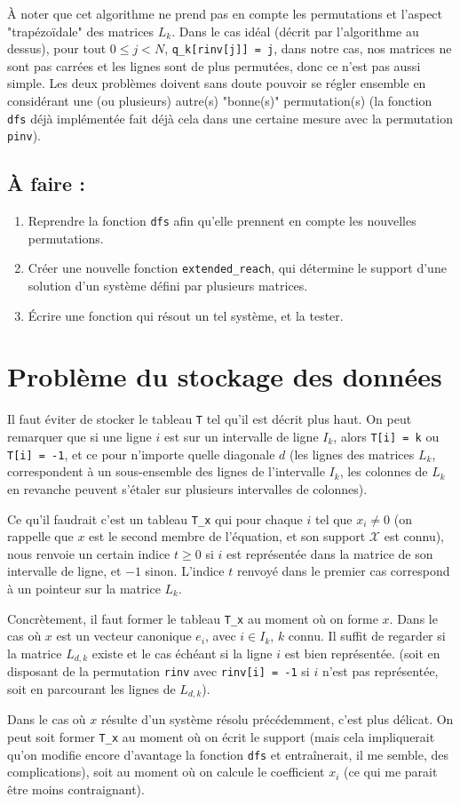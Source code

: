\documentclass{article}
\begin{document}
À noter que cet algorithme ne prend pas en compte les permutations et l'aspect "trapézoïdale" des matrices $L_k$.
Dans le cas idéal (décrit par l'algorithme au dessus), pour tout $0 \leq j < N$, \verb$q_k[rinv[j]] = j$, dans notre cas, nos matrices ne sont pas carrées et les lignes sont de plus permutées, donc ce n'est pas aussi simple.
Les deux problèmes doivent sans doute pouvoir se régler ensemble en considérant une (ou plusieurs) autre(s) "bonne(s)" permutation(s) (la fonction \verb$dfs$ déjà implémentée fait déjà cela dans une certaine mesure avec la permutation \verb$pinv$). 

\subsection{À faire :} 
\begin{enumerate}
\item Reprendre la fonction \verb$dfs$ afin qu'elle prennent en compte les nouvelles permutations.
\item Créer une nouvelle fonction \verb$extended_reach$, qui détermine le support d'une solution d'un système défini par plusieurs matrices.
\item Écrire une fonction qui résout un tel système, et la tester.
\end{enumerate}

\section{Problème du stockage des données}

Il faut éviter de stocker le tableau \verb$T$ tel qu'il est décrit plus haut. On peut remarquer que si une ligne $i$ est sur un intervalle de ligne $I_k$, alors \verb$T[i] = k$ ou \verb$T[i] = -1$, et ce pour n'importe quelle diagonale $d$ (les lignes des matrices $L_k$, correspondent à un sous-ensemble des lignes de l'intervalle $I_k$, les colonnes de $L_k$ en revanche peuvent s'étaler sur plusieurs intervalles de colonnes).

Ce qu'il faudrait c'est un tableau \verb$T_x$ qui pour chaque $i$ tel que $x_i \not= 0$ (on rappelle que $x$ est le second membre de l'équation, et son support $\mathcal{X}$ est connu), nous renvoie un certain indice $t \geq 0$ si $i$ est représentée dans la matrice de son intervalle de ligne, et $-1$ sinon.
L'indice $t$ renvoyé dans le premier cas correspond à un pointeur sur la matrice $L_k$.

Concrètement, il faut former le tableau \verb$T_x$ au moment où on forme $x$. 
Dans le cas où $x$ est un vecteur canonique $e_i$, avec $i \in I_k$, $k$ connu. Il suffit de regarder si la matrice $L_{d,k}$ existe et le cas échéant si la ligne $i$ est bien représentée. (soit en disposant de la permutation \verb$rinv$ avec \verb$rinv[i] = -1$ si $i$ n'est pas représentée, soit en parcourant les lignes de $L_{d,k}$).

Dans le cas où $x$ résulte d'un système résolu précédemment, c'est plus délicat. On peut soit former \verb$T_x$ au moment où on écrit le support (mais cela impliquerait qu'on modifie encore d'avantage la fonction \verb$dfs$ et entraînerait, il me semble, des complications), soit au moment où on calcule le coefficient $x_i$ (ce qui me parait être moins contraignant).
\end{document}
